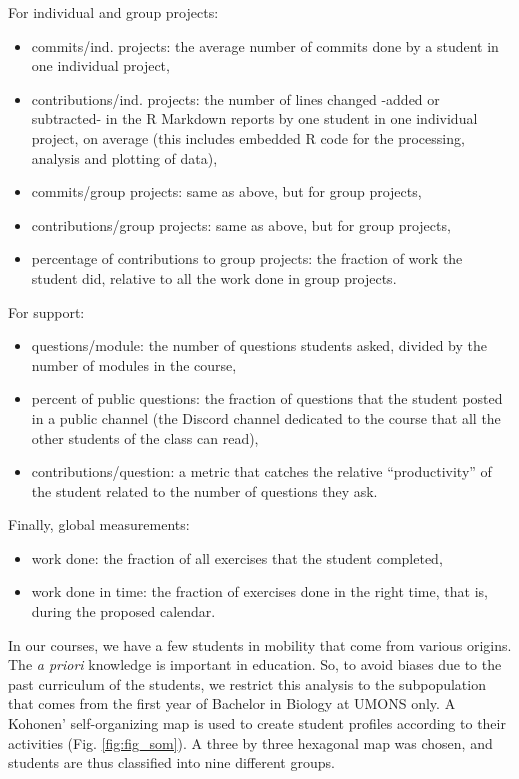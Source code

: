\documentclass{aims}
\theoremstyle{definition}
\begin{document}
For individual and group projects:

\begin{itemize}
\item
  commits/ind. projects: the average number of commits done by a student
  in one individual project,
\item
  contributions/ind. projects: the number of lines changed -added or
  subtracted- in the R Markdown reports by one student in one individual
  project, on average (this includes embedded R code for the processing,
  analysis and plotting of data),
\item
  commits/group projects: same as above, but for group projects,
\item
  contributions/group projects: same as above, but for group projects,
\item
  percentage of contributions to group projects: the fraction of work
  the student did, relative to all the work done in group projects.
\end{itemize}

For support:

\begin{itemize}
\item
  questions/module: the number of questions students asked, divided by
  the number of modules in the course,
\item
  percent of public questions: the fraction of questions that the
  student posted in a public channel (the Discord channel dedicated to
  the course that all the other students of the class can read),
\item
  contributions/question: a metric that catches the relative
  ``productivity'' of the student related to the number of questions
  they ask.
\end{itemize}

Finally, global measurements:

\begin{itemize}
\item
  work done: the fraction of all exercises that the student completed,
\item
  work done in time: the fraction of exercises done in the right time,
  that is, during the proposed calendar.
\end{itemize}

In our courses, we have a few students in mobility that come from
various origins. The \emph{a priori} knowledge is important in
education. So, to avoid biases due to the past curriculum of the
students, we restrict this analysis to the subpopulation that comes from
the first year of Bachelor in Biology at UMONS only. A Kohonen'
self-organizing map is used to create student profiles according to
their activities (Fig. \ref {fig:fig_som}). A three by three hexagonal
map was chosen, and students are thus classified into nine different
groups.
\end{document}
